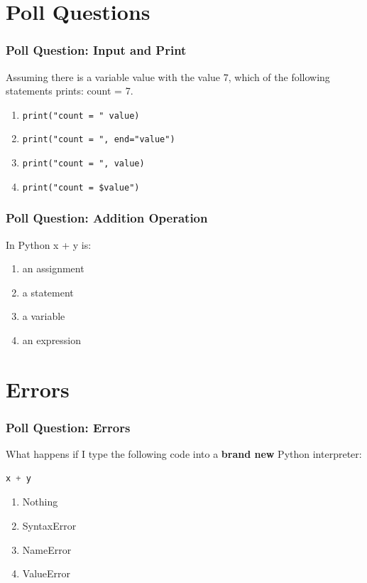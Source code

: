 \documentclass{beamer}
\begin{document}
\section{Poll Questions}

%
% 
%
\begin{frame}[fragile]
  \frametitle{Poll Question: Input and Print}
  Assuming there is a variable value with the value 7, which of the following statements prints: count = 7.
  \begin{enumerate}[A]
    \item \lstinline{print("count = " value)}
    \item \lstinline{print("count = ", end="value")}
    \item \lstinline{print("count = ", value)}
    \item \lstinline{print("count = $value")}
  \end{enumerate}
\end{frame}

%
%
%
\begin{frame}
  \frametitle{Poll Question: Addition Operation}
  In Python x + y is:
  \begin{enumerate}[A]
    \item an assignment
    \item a statement
    \item a variable
    \item an expression
  \end{enumerate}
\end{frame}

\section{Errors}

%
%
%
\begin{frame}[fragile]
  \frametitle{Poll Question: Errors}
  What happens if I type the following code into a \textbf{brand new} Python interpreter:
  \begin{lstlisting}[language=Python]
  x + y \end{lstlisting}
  \begin{enumerate}[A]
    \item Nothing
    \item SyntaxError
    \item NameError
    \item ValueError
  \end{enumerate}
\end{frame}
\end{document}
